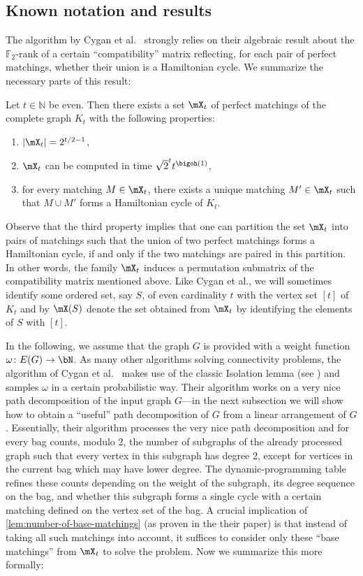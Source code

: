 \documentclass[a4paper,UKenglish,cleveref, autoref, thm-restate]{lipics-v2021}
\begin{document}
\subsection{Known notation and results}
The algorithm by Cygan et al.~\cite{DBLP:journals/jacm/CyganKN18} strongly relies on their algebraic result about the $\mathbb{F}_2$-rank of a certain ``compatibility'' matrix reflecting, for each pair of perfect matchings, whether their union is a Hamiltonian cycle. We summarize the necessary parts of this result:
\begin{theorem}\label{lem:number-of-base-matchings}
	Let $t \in \mathbb{N}$ be even.
	Then there exists a set $\mX_t$ of perfect matchings of the complete graph $K_t$ with the following properties:
	\begin{enumerate}
		\item $|\mX_t| = 2^{t/2-1}$,
		\item $\mX_t$ can be computed in time $\sqrt{2}^t t^{\bigoh(1)}$,
		\item for every matching $M \in \mX_t$, there exists a unique matching $M' \in \mX_t$ such that $M \cup M'$ forms a Hamiltonian cycle of $K_t$.
	\end{enumerate}
\end{theorem}
Observe that the third property implies that one can partition the set $\mX_t$ into pairs of matchings such that the union of two perfect matchings forms a Hamiltonian cycle, if and only if the two matchings are paired in this partition. 
In other words, the family $\mX_t$ induces a permutation submatrix of the compatibility matrix mentioned above.
Like Cygan et al., we will sometimes identify some ordered set, say $S$, of even cardinality $t$ with the vertex set $[t]$ of $K_t$ and by $\mX(S)$ denote the set obtained from $\mX_t$ by identifying the elements of $S$ with $[t]$. 

In the following, we assume that the graph $G$ is provided with a weight function $\omega \colon E(G) \to \bN$.
As many other algorithms solving connectivity problems, the algorithm of Cygan et al.~\cite{DBLP:journals/jacm/CyganKN18} makes use of the classic Isolation lemma (see \cite{DBLP:journals/combinatorica/MulmuleyVV87}) and samples $\omega$ in a certain probabilistic way.
Their algorithm works on a very nice path decomposition of the input graph $G$---in the next subsection we will show how to obtain a ``useful'' path decomposition of $G$ from a linear arrangement of $G$.  
Essentially, their algorithm processes the very nice path decomposition and for every bag counts, modulo 2, the number of subgraphs of the already processed graph such that every vertex in this subgraph has degree 2, except for vertices in the current bag which may have lower degree.
The dynamic-programming table refines these counts depending on the weight of the subgraph, its degree sequence on the bag, and whether this subgraph forms a single cycle with a certain matching defined on the vertex set of the bag.
A crucial implication of \cref{lem:number-of-base-matchings} (as proven in the their paper) is that instead of taking all such matchings into account, it suffices to consider only these ``base matchings'' from $\mX_t$ to solve the problem.
Now we summarize this more formally:
\end{document}
